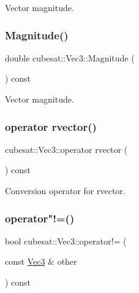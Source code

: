 Vector magnitude. 

\mbox{\label{structcubesat_1_1Vec3_aaea2a6f5fb2effb88b791a898c93d58d}} 
\subsubsection{\texorpdfstring{Magnitude()}{Magnitude()}}
{\footnotesize\ttfamily double cubesat\+::\+Vec3\+::\+Magnitude (\begin{DoxyParamCaption}{ }\end{DoxyParamCaption}) const\hspace{0.3cm}{\ttfamily [inline]}}



Vector magnitude. 

\mbox{\label{structcubesat_1_1Vec3_a23859048647c86ff4a27d58b8ca9567e}} 
\subsubsection{\texorpdfstring{operator rvector()}{operator rvector()}}
{\footnotesize\ttfamily cubesat\+::\+Vec3\+::operator rvector (\begin{DoxyParamCaption}{ }\end{DoxyParamCaption}) const\hspace{0.3cm}{\ttfamily [inline]}}



Conversion operator for rvector. 

\mbox{\label{structcubesat_1_1Vec3_a8408f1827a8fbe8b38a927d70bee8d54}} 
\subsubsection{\texorpdfstring{operator"!=()}{operator!=()}}
{\footnotesize\ttfamily bool cubesat\+::\+Vec3\+::operator!= (\begin{DoxyParamCaption}\item[{const \hyperlink{structcubesat_1_1Vec3}{Vec3} \&}]{other }\end{DoxyParamCaption}) const\hspace{0.3cm}{\ttfamily [inline]}}

